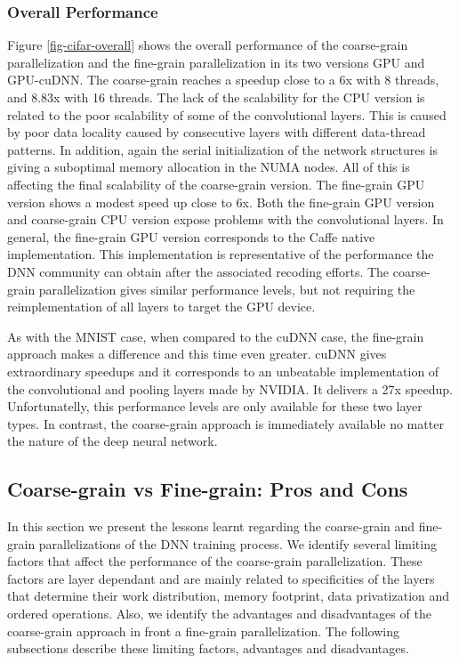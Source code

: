 \subsubsection{Overall Performance}
Figure \ref{fig-cifar-overall} shows the overall performance of
the coarse-grain parallelization and the fine-grain parallelization in
its two versions GPU and GPU-cuDNN. The coarse-grain reaches a speedup
close to a 6x with 8 threads, and 8.83x with 16 threads. The lack of
the scalability for the CPU version is related to the poor scalability
of some of the convolutional layers. This is caused by poor data locality caused by consecutive layers with different data-thread patterns. 
In addition, again the serial initialization of
the network structures is giving a suboptimal memory allocation in
the NUMA nodes. All of this is affecting the final scalability of
the coarse-grain version. The fine-grain GPU version shows a
modest speed up close to 6x. Both the fine-grain GPU version and 
coarse-grain CPU version expose problems with the convolutional layers.
In general, the fine-grain GPU version corresponds to the Caffe native 
implementation. This implementation is representative of the 
performance the DNN community can obtain after the associated recoding 
efforts. The coarse-grain parallelization gives similar performance levels, but not requiring the reimplementation of all layers to target the GPU device. 

As with the MNIST case, when compared to the cuDNN case, the fine-grain 
approach makes a difference and this time even greater. cuDNN gives 
extraordinary speedups and it corresponds to an unbeatable implementation 
of the convolutional and pooling layers made by NVIDIA. It delivers a 
27x speedup. Unfortunatelly, this performance levels are only available 
for these two layer types. In contrast, the coarse-grain approach is 
immediately available no matter the nature of the deep neural network.

\subsection{Coarse-grain vs Fine-grain: Pros and Cons}
In this section we present the lessons learnt regarding the coarse-grain 
and fine-grain parallelizations of the DNN training process. We identify 
several limiting factors that affect the performance of the 
coarse-grain parallelization. These factors are layer dependant and are 
mainly related to specificities of the layers that determine their 
work distribution, memory footprint, data privatization and ordered 
operations. Also, we identify the advantages and disadvantages of 
the coarse-grain approach in front a fine-grain parallelization. 
The following subsections describe these limiting factors, 
advantages and disadvantages.

